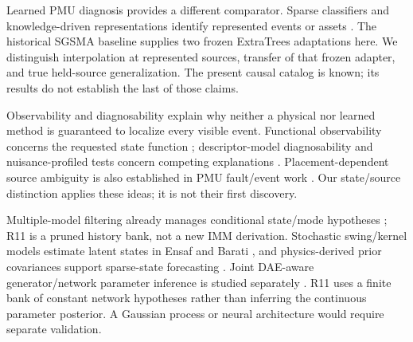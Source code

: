 Learned PMU diagnosis provides a different comparator. Sparse classifiers and knowledge-driven representations identify represented events or assets \cite{pandey2020realtime,li2024knowledge,yildiz2024few}. The historical SGSMA baseline supplies two frozen ExtraTrees adaptations here. We distinguish interpolation at represented sources, transfer of that frozen adapter, and true held-source generalization. The present causal catalog is known; its results do not establish the last of those claims.

Observability and diagnosability explain why neither a physical nor learned method is guaranteed to localize every visible event. Functional observability concerns the requested state function \cite{fernando2010functional,montanari2022functional}; descriptor-model diagnosability and nuisance-profiled tests concern competing explanations \cite{eriksson2013diagnosability,scharf1994matched}. Placement-dependent source ambiguity is also established in PMU fault/event work \cite{jamei2020limits,conte2023fault,yildiz2025sparse}. Our state/source distinction applies these ideas; it is not their first discovery.

Multiple-model filtering already manages conditional state/mode hypotheses \cite{blom1988imm}; R11 is a pruned history bank, not a new IMM derivation. Stochastic swing/kernel models estimate latent states in Ensaf and Barati \cite{ensaf2023kernel}, and physics-derived prior covariances support sparse-state forecasting \cite{tartakovsky2023gp}. Joint DAE-aware generator/network parameter inference is studied separately \cite{albustami2026dae}. R11 uses a finite bank of constant network hypotheses rather than inferring the continuous parameter posterior. A Gaussian process or neural architecture would require separate validation.

